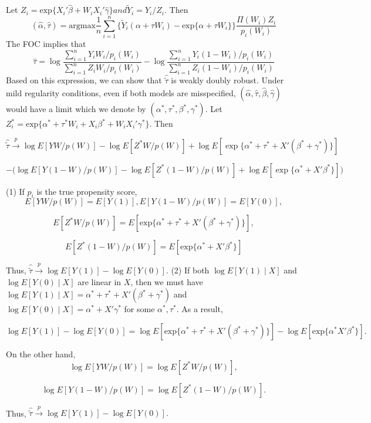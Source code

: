 \documentclass[a4paper,12pt]{article}
\theoremstyle{plain}
\begin{document}
Let $Z_i = \mathrm{exp}\{X_i' \hat{\beta} + W_i X_i' \hat{\gamma}\} and \tilde{Y}_i = Y_i / Z_i$. Then 
$$(\hat{\alpha}, \hat{\tau}) = \mathrm{argmax}\frac{1}{n}\sum_{i=1}^{n}\{\tilde{Y}_i (\alpha + \tau W_i) - \mathrm{exp}\{\alpha + \tau W_i\}\}\frac{\Pi(W_i)Z_i}{p_i(W_i)}$$
The FOC implies that 
$$\hat{\tau} = \log\frac{\sum_{i=1}^{n}Y_i W_i / p_i(W_i)}{\sum_{i=1}^{n}Z_i W_i / p_i(W_i)} - \log \frac{\sum_{i=1}^{n}Y_i (1 - W_i) / p_i(W_i)}{\sum_{i=1}^{n}Z_i (1 - W_i) / p_i(W_i)}$$
Based on this expression, we can show that $\hat{\tilde{\tau}}$ is weakly doubly robust. Under mild regularity conditions, even if both models are misspecified, $(\hat{\alpha}, \hat{\tau}, \hat{\beta}, \hat{\gamma})$ would have a limit which we denote by $(\alpha^{*}, \tau^{*}, \beta^{*}, \gamma^{*})$. Let $Z^{*}_i = \mathrm{exp}\{\alpha^{*} + \tau^{*}W_i + X_i \beta^{*} + W_i X_i' \gamma^{*}\}$. Then

$$\hat{\tilde{\tau}} \stackrel{p}{\rightarrow} \log E[YW / p(W)] - \log E[Z^{*}W / p(W)] + \log E[\exp\{\alpha^{*} + \tau^{*} + X'(\beta^{*} + \gamma^{*})\}]$$

$$ - \bigg(\log E[Y(1 - W) / p(W)] - \log E[Z^{*}(1 - W) / p(W)] + \log E[\exp\{\alpha^{*} + X'\beta^{*}\}] \bigg)$$

(1) If $p_i$ is the true propensity score, 
$$E[YW / p(W)] = E[Y(1)], E[Y(1- W) / p(W)] = E[Y(0)],$$

$$E[Z^{*}W / p(W)] = E[\mathrm{exp}\{\alpha^{*} + \tau^{*} + X'(\beta^{*} + \gamma^{*})\}],$$

$$E[Z^{*}(1 - W) / p(W)] = E[\mathrm{exp}\{\alpha^{*} + X'\beta^{*}\}]$$

Thus, $\hat{\tilde{\tau}}\stackrel{p}{\rightarrow} \log E[Y(1)] - \log E[Y(0)]$.
(2) If both $\log E[Y(1) \mid X]$ and $\log E[Y(0) \mid X]$ are linear in $X$, then we must have $\log E[Y(1) \mid X] = \alpha^{*} + \tau^{*} + X'(\beta^{*} + \gamma^{*})$ and $\log E[Y(0) \mid X] = \alpha^{*} + X'\gamma^{*}$ for some $\alpha^{*}, \tau^{*}$. As a result,

$$\log E[Y(1)] - \log E[Y(0)] = \log E[\mathrm{exp}\{\alpha^{*} + \tau^{*}+ X' (\beta^{*} + \gamma^{*})\}] - \log E[\mathrm{exp}\{\alpha^{*}  X' \beta^{*} \}].$$

On the other hand,
$$\log E[YW / p(W)] =  \log E[Z^{*} W / p(W)],$$

$$\log E[Y(1 - W) / p(W)] = \log E[Z^{*} (1 - W) / p(W)].$$

Thus, $\hat{\tilde{\tau}}\stackrel{p}{\rightarrow} \log E[Y(1)] - \log E[Y(0)].$
\end{document}
